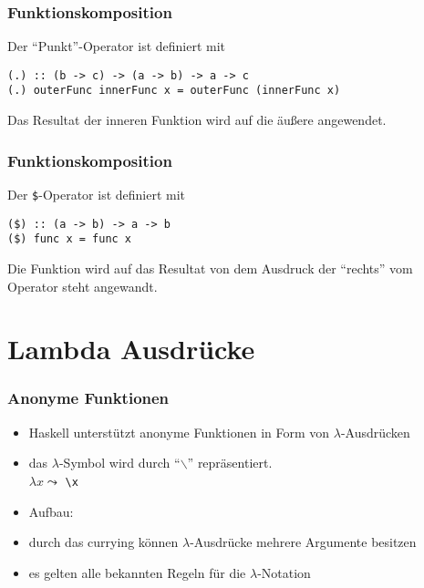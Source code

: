 \begin{frame}[fragile]
\frametitle{Funktionskomposition}
\begin{block}{Der "`Punkt"'-Operator ist definiert mit}
\begin{lstlisting}
(.) :: (b -> c) -> (a -> b) -> a -> c
(.) outerFunc innerFunc x = outerFunc (innerFunc x)
\end{lstlisting}
Das Resultat der inneren Funktion wird auf die äußere angewendet.
\end{block}
\end{frame}

\begin{frame}[fragile]
\frametitle{Funktionskomposition}
\begin{block}{Der \lstinline|$|-Operator ist definiert mit}
\begin{lstlisting}
($) :: (a -> b) -> a -> b
($) func x = func x
\end{lstlisting}
Die Funktion wird auf das Resultat von dem Ausdruck der "`rechts"' vom Operator steht angewandt.
\end{block}
\end{frame}


\section{Lambda Ausdrücke}
\begin{frame}
\frametitle{Anonyme Funktionen}
\begin{block}{\vspace*{-3ex}}
\begin{itemize}
  \item Haskell unterstützt anonyme Funktionen in Form von $\lambda$-Ausdrücken
  \item das $\lambda$-Symbol wird durch "`$\backslash$"' repräsentiert.\\ $\lambda x \leadsto$ \lstinline|\x|
  \item Aufbau: \\
  \item durch das currying können $\lambda$-Ausdrücke mehrere Argumente besitzen
  \item es gelten alle bekannten Regeln für die $\lambda$-Notation
\end{itemize}
\begin{center}
\scalebox{0.8}{}
\end{center}
\end{block}
\end{frame}

